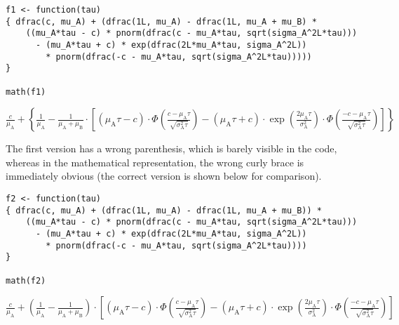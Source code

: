 \begin{verbatim}
f1 <- function(tau)
{ dfrac(c, mu_A) + (dfrac(1L, mu_A) - dfrac(1L, mu_A + mu_B) * 
    ((mu_A*tau - c) * pnorm(dfrac(c - mu_A*tau, sqrt(sigma_A^2L*tau)))
      - (mu_A*tau + c) * exp(dfrac(2L*mu_A*tau, sigma_A^2L))
        * pnorm(dfrac(-c - mu_A*tau, sqrt(sigma_A^2L*tau)))))
}

math(f1)
\end{verbatim}

\({\displaystyle{\frac{c}{{\mu}_{\mathrm{A}}}}}{+}{\left\{{\displaystyle{\frac{1}{{\mu}_{\mathrm{A}}}}}{-}{{\displaystyle{\frac{1}{{{\mu}_{\mathrm{A}}}{+}{{\mu}_{\mathrm{B}}}}}}{\cdot}{\left[{{\left({{{\mu}_{\mathrm{A}}}{{}}{\tau}}{-}{c}\right)}{\cdot}{\Phi{\left(\displaystyle{\frac{{c}{-}{{{\mu}_{\mathrm{A}}}{{}}{\tau}}}{\sqrt{{{\sigma}_{\mathrm{A}}^{2}}{{}}{\tau}}}}\right)}}}{-}{{{\left({{{\mu}_{\mathrm{A}}}{{}}{\tau}}{+}{c}\right)}{\cdot}{\exp{\left(\displaystyle{\frac{{{2}{{}}{{\mu}_{\mathrm{A}}}}{{}}{\tau}}{{\sigma}_{\mathrm{A}}^{2}}}\right)}}}{\cdot}{\Phi{\left(\displaystyle{\frac{{{-}{c}}{-}{{{\mu}_{\mathrm{A}}}{{}}{\tau}}}{\sqrt{{{\sigma}_{\mathrm{A}}^{2}}{{}}{\tau}}}}\right)}}}\right]}}\right\}}\)

The first version has a wrong parenthesis, which is barely visible in the code,
whereas in the mathematical representation, the wrong curly brace is immediately
obvious (the correct version is shown below for comparison).

\begin{verbatim}
f2 <- function(tau)
{ dfrac(c, mu_A) + (dfrac(1L, mu_A) - dfrac(1L, mu_A + mu_B)) * 
    ((mu_A*tau - c) * pnorm(dfrac(c - mu_A*tau, sqrt(sigma_A^2L*tau)))
      - (mu_A*tau + c) * exp(dfrac(2L*mu_A*tau, sigma_A^2L))
        * pnorm(dfrac(-c - mu_A*tau, sqrt(sigma_A^2L*tau))))
}

math(f2)
\end{verbatim}

\({\displaystyle{\frac{c}{{\mu}_{\mathrm{A}}}}}{+}{{\left({\displaystyle{\frac{1}{{\mu}_{\mathrm{A}}}}}{-}{\displaystyle{\frac{1}{{{\mu}_{\mathrm{A}}}{+}{{\mu}_{\mathrm{B}}}}}}\right)}{\cdot}{\left[{{\left({{{\mu}_{\mathrm{A}}}{{}}{\tau}}{-}{c}\right)}{\cdot}{\Phi{\left(\displaystyle{\frac{{c}{-}{{{\mu}_{\mathrm{A}}}{{}}{\tau}}}{\sqrt{{{\sigma}_{\mathrm{A}}^{2}}{{}}{\tau}}}}\right)}}}{-}{{{\left({{{\mu}_{\mathrm{A}}}{{}}{\tau}}{+}{c}\right)}{\cdot}{\exp{\left(\displaystyle{\frac{{{2}{{}}{{\mu}_{\mathrm{A}}}}{{}}{\tau}}{{\sigma}_{\mathrm{A}}^{2}}}\right)}}}{\cdot}{\Phi{\left(\displaystyle{\frac{{{-}{c}}{-}{{{\mu}_{\mathrm{A}}}{{}}{\tau}}}{\sqrt{{{\sigma}_{\mathrm{A}}^{2}}{{}}{\tau}}}}\right)}}}\right]}}\)


